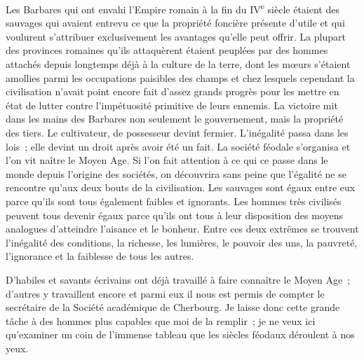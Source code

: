 \documentclass[french,twoside]{book} %
\newcommand{\astermono}{\medskip\centerline{\color{rubric}\large\selectfont{\syms ✻}}\medskip\par}%
\begin{document}
Les Barbares qui ont envahi l’Empire romain à la fin du IV\textsuperscript{e} siècle étaient des sauvages qui avaient entrevu ce que la propriété foncière présente d’utile et qui voulurent s’attribuer exclusivement les avantages qu’elle peut offrir. La plupart des provinces romaines qu’ils attaquèrent étaient peuplées par des hommes attachés depuis longtemps déjà à la culture de la terre, dont les mœurs s’étaient amollies parmi les occupations paisibles des champs et chez lesquels cependant la civilisation n’avait point encore fait d’assez grands progrès pour les mettre en état de lutter contre l’impétuosité primitive de leurs ennemis. La victoire mit dans les mains des Barbares non seulement le gouvernement, mais la propriété des tiers. Le cultivateur, de possesseur devint fermier. L'inégalité passa dans les lois ; elle devint un droit après avoir été un fait. La société féodale s’organisa et l’on vit naître le Moyen Age. Si l’on fait attention à ce qui ce passe dans le monde depuis l’origine des sociétés, on découvrira sans peine que l’égalité ne se rencontre qu’aux deux bouts de la civilisation. Les sauvages sont égaux entre eux parce qu’ils sont tous également faibles et ignorants. Les hommes très civilisés peuvent tous devenir égaux parce qu’ils ont tous à leur disposition des moyens analogues d’atteindre l’aisance et le bonheur. Entre ces deux extrêmes se trouvent l’inégalité des conditions, la richesse, les lumières, le pouvoir des uns, la pauvreté, l’ignorance et la faiblesse de tous les autres.\par
D'habiles et savants écrivains ont déjà travaillé à faire connaître le Moyen Age ; d’autres y travaillent encore et parmi eux il nous est permis de compter le secrétaire de la Société académique de Cherbourg. Je laisse donc cette grande tâche à des hommes plus capables que moi de la remplir ; je ne veux ici qu’examiner un coin de l’immense tableau que les siècles féodaux déroulent à nos yeux.\par

\astermono
\end{document}
